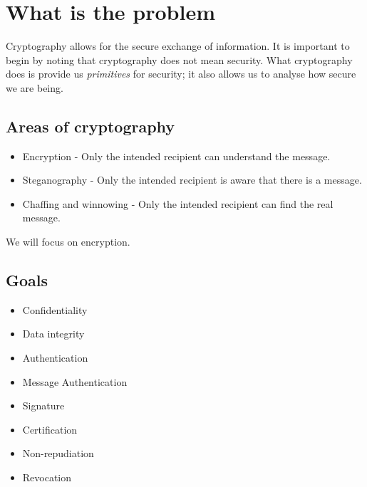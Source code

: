 \documentclass{article}
\theoremstyle{definition}
\begin{document}
\section{What is the problem}
Cryptography allows for the secure exchange of information.
It is important to begin by noting that cryptography does not mean security.
What cryptography does is provide us \textit{primitives} for security; it also
allows us to analyse how secure we are being.

\subsection{Areas of cryptography}
\begin{itemize}
  \item Encryption - Only the intended recipient can understand the message.
  \item Steganography - Only the intended recipient is aware that there is a message.
  \item Chaffing and winnowing - Only the intended recipient can find the real message.
\end{itemize}

We will focus on encryption.

\subsection{Goals}

\begin{itemize}
  \item Confidentiality
  \item Data integrity
  \item Authentication
  \item Message Authentication
  \item Signature
  \item Certification
  \item Non-repudiation
  \item Revocation
\end{itemize}
\end{document}
